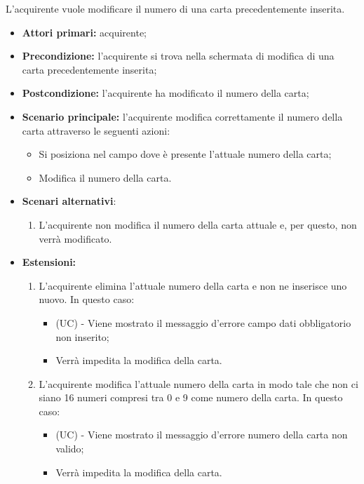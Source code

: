 L'acquirente vuole modificare il numero di una carta precedentemente inserita.
\begin{itemize}
    \item \textbf{Attori primari:} acquirente;
    \item \textbf{Precondizione:} l'acquirente si trova nella schermata di modifica di una carta precedentemente inserita;
    \item \textbf{Postcondizione:} l'acquirente ha modificato il numero della carta;
    \item \textbf{Scenario principale:} l'acquirente modifica correttamente il numero della carta attraverso le seguenti azioni:
    \begin{itemize}
        \item Si posiziona nel campo dove è presente l'attuale numero della carta;
        \item Modifica il numero della carta.
    \end{itemize}
    \item \textbf{Scenari alternativi}:
    \begin{enumerate}[label=\lett]
        \item L'acquirente non modifica il numero della carta attuale e, per questo, non verrà modificato.
    \end{enumerate}
    \item \textbf{Estensioni:}
    \begin{enumerate}[label=\lett]
        \item L'acquirente elimina l'attuale numero della carta e non ne inserisce uno nuovo. In questo caso:
        \begin{itemize}
            \item (UC) - Viene mostrato il messaggio d'errore campo dati obbligatorio non inserito;
            \item Verrà impedita la modifica della carta.
        \end{itemize}
        \item L'acquirente modifica l'attuale numero della carta in modo tale che non ci siano 16 numeri compresi tra 0 e 9 come numero della carta. In questo caso:
        \begin{itemize}
            \item (UC) - Viene mostrato il messaggio d'errore numero della carta non valido;
            \item Verrà impedita la modifica della carta.
        \end{itemize}
    \end{enumerate}
\end{itemize}

